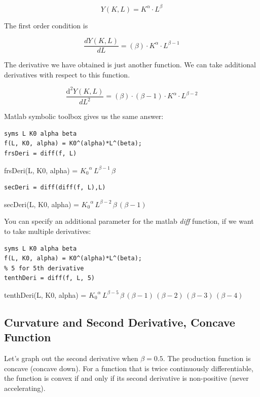 \documentclass[
]{book}
\begin{document}
\[Y(K,L)=K^{\alpha } \cdot L^{\beta }\]

The first order condition is

\[\frac{dY(K,L)}{dL}=(\beta )\cdot K^{\alpha } \cdot L^{\beta -1}\]

The derivative we have obtained is just another function. We can take
additional derivatives with respect to this function.

\[\frac{{\textrm{d}}^2 Y(K,L)}{dL^2 }=(\beta )\cdot (\beta -1)\cdot K^{\alpha } \cdot L^{\beta -2}\]

Matlab symbolic toolbox gives us the same answer:

\begin{verbatim}
syms L K0 alpha beta
f(L, K0, alpha) = K0^(alpha)*L^(beta);
frsDeri = diff(f, L)
\end{verbatim}

frsDeri(L, K0, alpha) =
\(\displaystyle {K_0 }^{\alpha } \,L^{\beta -1} \,\beta\)

\begin{verbatim}
secDeri = diff(diff(f, L),L)
\end{verbatim}

secDeri(L, K0, alpha) =
\(\displaystyle {K_0 }^{\alpha } \,L^{\beta -2} \,\beta \,{\left(\beta -1\right)}\)

You can specify an additional parameter for the matlab \emph{diff} function,
if we want to take multiple derivatives:

\begin{verbatim}
syms L K0 alpha beta
f(L, K0, alpha) = K0^(alpha)*L^(beta);
% 5 for 5th derivative
tenthDeri = diff(f, L, 5)
\end{verbatim}

tenthDeri(L, K0, alpha) =
\(\displaystyle {K_0 }^{\alpha } \,L^{\beta -5} \,\beta \,{\left(\beta -1\right)}\,{\left(\beta -2\right)}\,{\left(\beta -3\right)}\,{\left(\beta -4\right)}\)

\hypertarget{curvature-and-second-derivative-concave-function}{%
\subsection{Curvature and Second Derivative, Concave Function}\label{curvature-and-second-derivative-concave-function}}

Let's graph out the second derivative when \(\beta =0.5\). The production
function is concave (concave down). For a function that is twice
continuously differentiable, the function is convex if and only if its
second derivative is non-positive (never accelerating).
\end{document}
